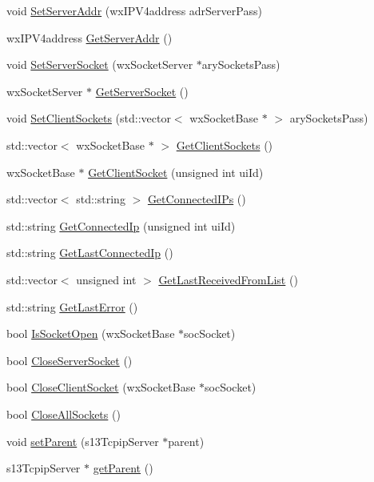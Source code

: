 \begin{DoxyCompactItemize}
void \hyperlink{classs13_w_x_w_server_ae66f4ea563b8a634ed28aa9bed286742}{Set\+Server\+Addr} (wx\+I\+P\+V4address adr\+Server\+Pass)
\item 
wx\+I\+P\+V4address \hyperlink{classs13_w_x_w_server_a3cee864a51df320cfcbc3db2b09c9c22}{Get\+Server\+Addr} ()
\item 
void \hyperlink{classs13_w_x_w_server_a7832c193c6a14dd71a0182249e53422c}{Set\+Server\+Socket} (wx\+Socket\+Server $\ast$ary\+Sockets\+Pass)
\item 
wx\+Socket\+Server $\ast$ \hyperlink{classs13_w_x_w_server_a65b556b75be46f487438f4359071048c}{Get\+Server\+Socket} ()
\item 
void \hyperlink{classs13_w_x_w_server_a2a3cadee75fcd83cf83ae18262bba4ad}{Set\+Client\+Sockets} (std\+::vector$<$ wx\+Socket\+Base $\ast$ $>$ ary\+Sockets\+Pass)
\item 
std\+::vector$<$ wx\+Socket\+Base $\ast$ $>$ \hyperlink{classs13_w_x_w_server_a7d1b2aa342e977dffb9a7a482ec50ba3}{Get\+Client\+Sockets} ()
\item 
wx\+Socket\+Base $\ast$ \hyperlink{classs13_w_x_w_server_a744ba21df9c9e7089c3952e79d42def5}{Get\+Client\+Socket} (unsigned int ui\+Id)
\item 
std\+::vector$<$ std\+::string $>$ \hyperlink{classs13_w_x_w_server_ac59722116cedb1611229a45ae3d4fea1}{Get\+Connected\+I\+Ps} ()
\item 
std\+::string \hyperlink{classs13_w_x_w_server_a6fdd1dd750f54bcba1ddf468fe6a3fd3}{Get\+Connected\+Ip} (unsigned int ui\+Id)
\item 
std\+::string \hyperlink{classs13_w_x_w_server_a4a967a859e7ae7f3b7cd0938a1c22b71}{Get\+Last\+Connected\+Ip} ()
\item 
std\+::vector$<$ unsigned int $>$ \hyperlink{classs13_w_x_w_server_a2a3cc76d8a69f7143c501cef760cbd9a}{Get\+Last\+Received\+From\+List} ()
\item 
std\+::string \hyperlink{classs13_w_x_w_server_a5bf13545d93e6683ac6b252a9d7bafed}{Get\+Last\+Error} ()
\item 
bool \hyperlink{classs13_w_x_w_server_aeebcae76aed097253f99b156cf391ca1}{Is\+Socket\+Open} (wx\+Socket\+Base $\ast$soc\+Socket)
\item 
bool \hyperlink{classs13_w_x_w_server_a6bfa9c2ea4798d48ab876b0804ef02a7}{Close\+Server\+Socket} ()
\item 
bool \hyperlink{classs13_w_x_w_server_a2be49cc63a256aebc2c54240085c5908}{Close\+Client\+Socket} (wx\+Socket\+Base $\ast$soc\+Socket)
\item 
bool \hyperlink{classs13_w_x_w_server_abef95fcd8140724244dbc7656a7db04b}{Close\+All\+Sockets} ()
\item 
void \hyperlink{classs13_w_x_w_server_a6d5d9decf323a17947153d4211b099a4}{set\+Parent} (s13\+Tcpip\+Server $\ast$parent)
\item 
s13\+Tcpip\+Server $\ast$ \hyperlink{classs13_w_x_w_server_abb6cd33f658da4313387c51eb8f02c15}{get\+Parent} ()
\end{DoxyCompactItemize}


